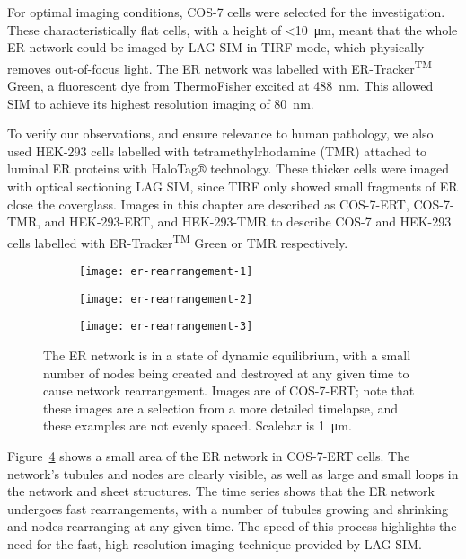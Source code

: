 For optimal imaging conditions, COS-7 cells were selected for the investigation.
These characteristically flat cells, with a height of <\SI{10}{\micro\meter},
meant that the whole ER network could be imaged by LAG SIM in TIRF mode, which physically removes out-of-focus light.
The ER network was labelled with ER-Tracker\textsuperscript{TM} Green, a fluorescent dye from ThermoFisher excited at \SI{488}{\nano\meter}.
This allowed SIM to achieve its highest resolution imaging of \SI{80}{\nano\meter}.

To verify our observations, and ensure relevance to human pathology, we also used HEK-293 cells labelled with tetramethylrhodamine (TMR) attached to luminal ER proteins with HaloTag® technology.
These thicker cells were imaged with optical sectioning LAG SIM, since TIRF only showed small fragments of ER close the coverglass.
Images in this chapter are described as COS-7-ERT, COS-7-TMR, and HEK-293-ERT, and HEK-293-TMR to describe COS-7 and HEK-293 cells labelled with ER-Tracker\textsuperscript{TM} Green or TMR respectively.

\begin{figure}[b!]
\centering
\begin{subfigure}[b]{0.325\textwidth}
	\texttt{[image: er-rearrangement-1]}
	\caption{}\label{fig:er-rearrangement-1}
\end{subfigure}\hfill
\begin{subfigure}[b]{0.325\textwidth}
	\texttt{[image: er-rearrangement-2]}
	\caption{}\label{fig:er-rearrangement-2}
\end{subfigure}\hfill
\begin{subfigure}[b]{0.325\textwidth}
	\texttt{[image: er-rearrangement-3]}
	\caption{}\label{fig:er-rearrangement-3}
\end{subfigure}
\caption[ER: Growing and shrinking tubules show the ER network is in a state of dynamic equilibrium]{The ER network is in a state of dynamic equilibrium, with a small number of nodes being created and destroyed at any given time to cause network rearrangement. Images are of COS-7-ERT; note that these images are a selection from a more detailed timelapse, and these examples are not evenly spaced. Scalebar is \SI{1}{\micro\metre}. }
\label{fig:ER-rearrangement}
\end{figure}

Figure~\ref{fig:ER-rearrangement} shows a small area of the ER network in COS-7-ERT cells.
The network's tubules and nodes are clearly visible, as well as large and small loops in the network and sheet structures.
The time series shows that the ER network undergoes fast rearrangements, with a number of tubules growing and shrinking and nodes rearranging at any given time.
The speed of this process highlights the need for the fast, high-resolution imaging technique provided by LAG SIM.


